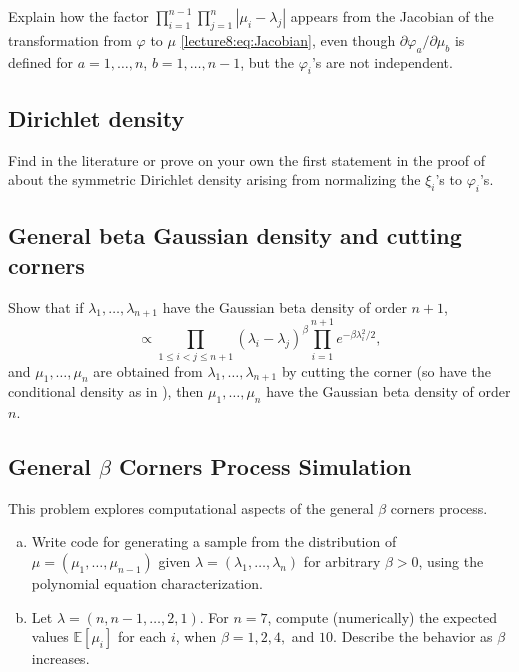 \documentclass[letterpaper,11pt,oneside,reqno]{book}
\numberwithin{equation}{chapter}  %
\theoremstyle{definition}
\begin{document}
Explain how the factor $\prod_{i=1}^{n-1}\prod_{j=1}^n|\mu_i-\lambda_j|$
appears from the Jacobian of the transformation from $\varphi$ to $\mu$
\eqref{lecture8:eq:Jacobian},
even though $\partial\varphi_a/\partial\mu_b$ is defined for
$a=1,\ldots,n  $, $b=1,\ldots,n-1$,
but the $\varphi_i$'s are not independent.

\subsection{Dirichlet density}
\label{lecture8:prob:dirichlet}

Find in the literature or prove on your own
the first statement in the proof of
 about the symmetric Dirichlet density arising from
normalizing the $\xi_i$'s to $\varphi_i$'s.

\subsection{General beta Gaussian density and cutting corners}

Show that if $\lambda_1,\ldots,\lambda_{n+1} $ have the Gaussian beta density of order $n+1$,
\begin{equation*}
	\propto \prod_{1\le i<j\le n+1}(\lambda_i-\lambda_j)^{\beta} \prod_{i=1}^{n+1}e^{-\beta\lambda_i^2/2},
\end{equation*}
and $\mu_1,\ldots,\mu_n $ are obtained from $\lambda_1,\ldots,\lambda_{n+1}$
by cutting the corner (so have the conditional density as in ),
then $\mu_1,\ldots,\mu_n$ have the Gaussian beta density of order $n$.

\subsection{General \texorpdfstring{\(\beta\)}{beta} Corners Process Simulation}
\label{lecture8:prob:corners_simulation}

This problem explores computational aspects of the general $\beta$ corners process.

\begin{enumerate}[(a)]
\item Write code for generating a sample from the distribution of $\mu = (\mu_1, \ldots, \mu_{n-1})$ given $\lambda = (\lambda_1, \ldots, \lambda_n)$ for arbitrary $\beta > 0$, using the polynomial equation characterization.

\item Let $\lambda = (n, n-1, \ldots, 2, 1)$. For $n = 7$, compute (numerically) the expected values $\mathbb{E}[\mu_i]$ for each $i$, when $\beta = 1, 2, 4,$ and $10$. Describe the behavior as $\beta$ increases.
\end{enumerate}
\end{document}
